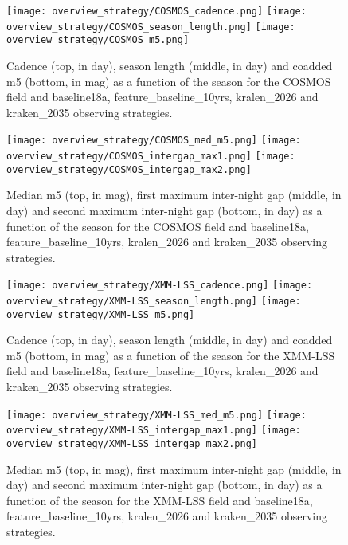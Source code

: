 \begin{figure}[htbp]
\begin{center}
  \texttt{[image: overview\_strategy/COSMOS\_cadence.png]}
  \texttt{[image: overview\_strategy/COSMOS\_season\_length.png]}
  \texttt{[image: overview\_strategy/COSMOS\_m5.png]}
 \caption{Cadence (top, in day), season length (middle, in day) and coadded m5 (bottom, in mag) as a function of the season for the COSMOS field and baseline18a, feature\_baseline\_10yrs, kralen\_2026 and kraken\_2035 observing strategies.}\label{fig:cosmos_cad}
\end{center}
\end{figure}

\begin{figure}[htbp]
\begin{center}
  
  \texttt{[image: overview\_strategy/COSMOS\_med\_m5.png]}
  \texttt{[image: overview\_strategy/COSMOS\_intergap\_max1.png]}
    \texttt{[image: overview\_strategy/COSMOS\_intergap\_max2.png]}
 \caption{Median m5 (top, in mag), first maximum inter-night gap (middle, in day) and second maximum inter-night gap (bottom, in day)  as a function of the season for the COSMOS field and baseline18a, feature\_baseline\_10yrs, kralen\_2026 and kraken\_2035 observing strategies.}\label{fig:cosmos_m5}
\end{center}
\end{figure}



\begin{figure}[htbp]
\begin{center}
  \texttt{[image: overview\_strategy/XMM-LSS\_cadence.png]}
  \texttt{[image: overview\_strategy/XMM-LSS\_season\_length.png]}
  \texttt{[image: overview\_strategy/XMM-LSS\_m5.png]}
 \caption{Cadence (top, in day), season length (middle, in day) and coadded m5 (bottom, in mag) as a function of the season for the XMM-LSS field and baseline18a, feature\_baseline\_10yrs, kralen\_2026 and kraken\_2035 observing strategies.}\label{fig:xmm-lss_cad}
\end{center}
\end{figure}

\begin{figure}[htbp]
\begin{center}
  
  \texttt{[image: overview\_strategy/XMM-LSS\_med\_m5.png]}
  \texttt{[image: overview\_strategy/XMM-LSS\_intergap\_max1.png]}
    \texttt{[image: overview\_strategy/XMM-LSS\_intergap\_max2.png]}
 \caption{Median m5 (top, in mag), first maximum inter-night gap (middle, in day) and second maximum inter-night gap (bottom, in day)  as a function of the season for the XMM-LSS field and baseline18a, feature\_baseline\_10yrs, kralen\_2026 and kraken\_2035 observing strategies.}\label{fig:xmm-lss_m5}
\end{center}
\end{figure}


